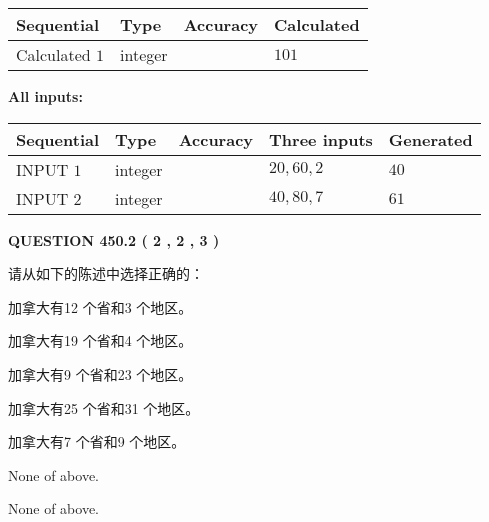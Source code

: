 \documentclass{ctexart}
\begin{document}
  
\noindent\begin{tabular}{|l|l|l|l|}
\hline
 Sequential & Type & Accuracy & Calculated \\ 
\hline
 
 
  Calculated $  1 $ & integer &  & 
  $ 101 $ 
 \\  \hline  
 \end{tabular}
   
   
   
   
\noindent\vspace{0.1in}\hspace{-0.08in} {\textbf{\Large{All inputs: }}}
   
   
  
  
\noindent\begin{tabular}{|l|l|l|l|l|}
\hline
 Sequential & Type & Accuracy & Three inputs & Generated \\ 
\hline
 
 
  INPUT $  1 $ & integer &  & $
 20
 , 
 60
 , 
 2
 $ & $ 40 $ 
 \\  \hline  
 
 
  INPUT $  2 $ & integer &  & $
 40
 , 
 80
 , 
 7
 $ & $ 61 $ 
 \\  \hline  
 \end{tabular}
   
   
  
\vspace{0.2in}
  
{\textbf{\Large{QUESTION
450.2 
 ( 2 , 2 , 3 )
}}}
  
  
请从如下的陈述中选择正确的：
 
 
加拿大有12 个省和3 个地区。
 
 
加拿大有19 个省和4 个地区。
 
 
加拿大有9 个省和23 个地区。
 
 
加拿大有25 个省和31 个地区。
 
 
加拿大有7 个省和9 个地区。
 
 
 None of above.
 
 
\noindent{}
 
 
 None of above.
 
 
\noindent{}
 
\end{document}
